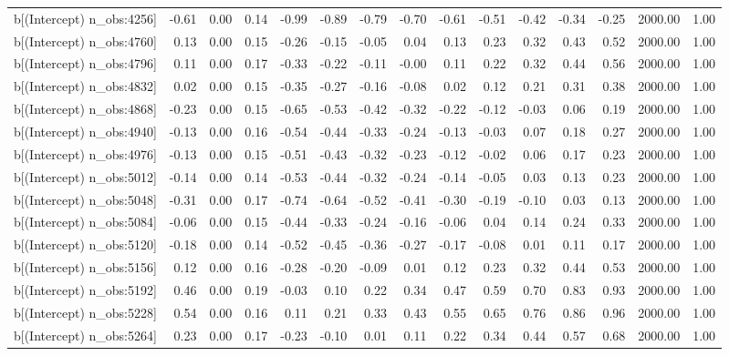 \begin{table}[ht]
\begin{tabular}{rrrrrrrrrrrrrrr}
  b[(Intercept) n\_obs:4256] & -0.61 & 0.00 & 0.14 & -0.99 & -0.89 & -0.79 & -0.70 & -0.61 & -0.51 & -0.42 & -0.34 & -0.25 & 2000.00 & 1.00 \\ 
  b[(Intercept) n\_obs:4760] & 0.13 & 0.00 & 0.15 & -0.26 & -0.15 & -0.05 & 0.04 & 0.13 & 0.23 & 0.32 & 0.43 & 0.52 & 2000.00 & 1.00 \\ 
  b[(Intercept) n\_obs:4796] & 0.11 & 0.00 & 0.17 & -0.33 & -0.22 & -0.11 & -0.00 & 0.11 & 0.22 & 0.32 & 0.44 & 0.56 & 2000.00 & 1.00 \\ 
  b[(Intercept) n\_obs:4832] & 0.02 & 0.00 & 0.15 & -0.35 & -0.27 & -0.16 & -0.08 & 0.02 & 0.12 & 0.21 & 0.31 & 0.38 & 2000.00 & 1.00 \\ 
  b[(Intercept) n\_obs:4868] & -0.23 & 0.00 & 0.15 & -0.65 & -0.53 & -0.42 & -0.32 & -0.22 & -0.12 & -0.03 & 0.06 & 0.19 & 2000.00 & 1.00 \\ 
  b[(Intercept) n\_obs:4940] & -0.13 & 0.00 & 0.16 & -0.54 & -0.44 & -0.33 & -0.24 & -0.13 & -0.03 & 0.07 & 0.18 & 0.27 & 2000.00 & 1.00 \\ 
  b[(Intercept) n\_obs:4976] & -0.13 & 0.00 & 0.15 & -0.51 & -0.43 & -0.32 & -0.23 & -0.12 & -0.02 & 0.06 & 0.17 & 0.23 & 2000.00 & 1.00 \\ 
  b[(Intercept) n\_obs:5012] & -0.14 & 0.00 & 0.14 & -0.53 & -0.44 & -0.32 & -0.24 & -0.14 & -0.05 & 0.03 & 0.13 & 0.23 & 2000.00 & 1.00 \\ 
  b[(Intercept) n\_obs:5048] & -0.31 & 0.00 & 0.17 & -0.74 & -0.64 & -0.52 & -0.41 & -0.30 & -0.19 & -0.10 & 0.03 & 0.13 & 2000.00 & 1.00 \\ 
  b[(Intercept) n\_obs:5084] & -0.06 & 0.00 & 0.15 & -0.44 & -0.33 & -0.24 & -0.16 & -0.06 & 0.04 & 0.14 & 0.24 & 0.33 & 2000.00 & 1.00 \\ 
  b[(Intercept) n\_obs:5120] & -0.18 & 0.00 & 0.14 & -0.52 & -0.45 & -0.36 & -0.27 & -0.17 & -0.08 & 0.01 & 0.11 & 0.17 & 2000.00 & 1.00 \\ 
  b[(Intercept) n\_obs:5156] & 0.12 & 0.00 & 0.16 & -0.28 & -0.20 & -0.09 & 0.01 & 0.12 & 0.23 & 0.32 & 0.44 & 0.53 & 2000.00 & 1.00 \\ 
  b[(Intercept) n\_obs:5192] & 0.46 & 0.00 & 0.19 & -0.03 & 0.10 & 0.22 & 0.34 & 0.47 & 0.59 & 0.70 & 0.83 & 0.93 & 2000.00 & 1.00 \\ 
  b[(Intercept) n\_obs:5228] & 0.54 & 0.00 & 0.16 & 0.11 & 0.21 & 0.33 & 0.43 & 0.55 & 0.65 & 0.76 & 0.86 & 0.96 & 2000.00 & 1.00 \\ 
  b[(Intercept) n\_obs:5264] & 0.23 & 0.00 & 0.17 & -0.23 & -0.10 & 0.01 & 0.11 & 0.22 & 0.34 & 0.44 & 0.57 & 0.68 & 2000.00 & 1.00 \\ 

\end{tabular}
\end{table}
